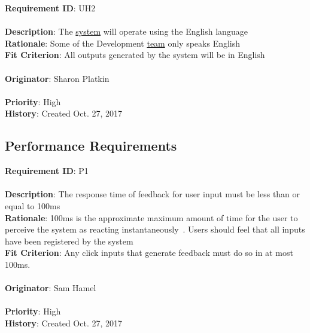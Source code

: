 \documentclass[11pt]{article}
\begin{document}
\begin{framed}
	\noindent\textbf{Requirement ID}: UH2 \hfill\\\\
	\noindent\textbf{Description}: The \hyperref[sec:definitions]{system} will operate using the English language \\
	\textbf{Rationale}: Some of the Development \hyperref[sec:definitions]{team} only speaks English \\
	\textbf{Fit Criterion}: All outputs generated by the system will be in English  \\\\
	\textbf{Originator}: Sharon Platkin \\\\
	\textbf{Priority}: High \hfill \\
	\noindent\textbf{History}: Created Oct. 27, 2017
\end{framed}

\subsection{Performance Requirements}

\begin{framed}
	\noindent\textbf{Requirement ID}: P1 \hfill\\\\
	\noindent\textbf{Description}: The response time of feedback for user input must be less than or equal to 100ms \\
	\textbf{Rationale}: 100ms is the approximate maximum amount of time for the user to perceive the system as reacting instantaneously~\autocite{response}. Users should feel that all inputs have been registered by the system\\
	\textbf{Fit Criterion}: Any click inputs that generate feedback must do so in at most 100ms.  \\\\
	\textbf{Originator}: Sam Hamel \\\\
	\textbf{Priority}: High \hfill \\
	\noindent\textbf{History}: Created Oct. 27, 2017
\end{framed}
\end{document}
